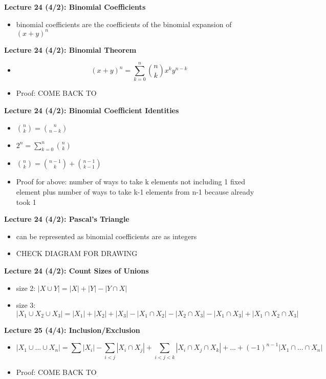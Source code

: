 \documentclass[twocolumn]{article}
\begin{document}
\textbf{Lecture 24 (4/2): Binomial Coefficients}
\begin{itemize}
    \item binomial coefficients are the coefficients of the binomial expansion of $(x+y)^n$
\end{itemize}

\textbf{Lecture 24 (4/2): Binomial Theorem}
\begin{itemize}
    \item $$(x+y)^n = \sum_{k=0}^n {n \choose k}x^k y^{n-k}$$
    \item Proof: COME BACK TO
\end{itemize}

\textbf{Lecture 24 (4/2): Binomial Coefficient Identities}
\begin{itemize}
    \item ${n \choose k} = {n \choose n-k}$
    \item $2^n = \sum_{k=0}^n {n \choose k}$
    \item ${n \choose k} = {n-1 \choose k}+{n-1 \choose k-1}$
    \item Proof for above: number of ways to take k elements not including 1 fixed element plus number of ways to take k-1 elements from n-1 because already took 1
\end{itemize}

\textbf{Lecture 24 (4/2): Pascal's Triangle}
\begin{itemize}
    \item can be represented as binomial coefficients are as integers
    \item CHECK DIAGRAM FOR DRAWING
\end{itemize}

\textbf{Lecture 24 (4/2): Count Sizes of Unions}
\begin{itemize}
    \item size 2: $|X \cup Y| = |X| + |Y| - |Y\cap X|$
    \item size 3: $|X_1 \cup X_2 \cup X_3| = |X_1|+|X_2|+|X_3|-|X_1 \cap X_2|-|X_2 \cap X_3|-|X_1 \cap X_3|+|X_1 \cap X_2 \cap X_3|$
\end{itemize}

\textbf{Lecture 25 (4/4): Inclusion/Exclusion}
\begin{itemize}
    \item $$|X_1 \cup ... \cup X_n| = \sum|X_i|-\sum_{i<j}|X_i \cap X_j|+\sum_{i<j<k}|X_i \cap X_j \cap X_k|+...+(-1)^{n-1} |X_1 \cap ... \cap X_n|$$
    \item Proof: COME BACK TO
\end{itemize}
\end{document}
